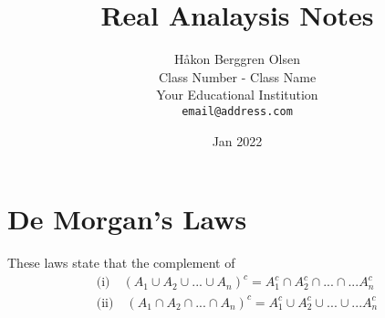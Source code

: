 \documentclass[12pt,fleqn,leqno,letterpaper]{article}
\title{Real Analaysis Notes}
\author{Håkon Berggren Olsen\\
  \small{Class Number - Class Name}\\
  \small{Your Educational Institution}\\
  \small{\texttt{email@address.com}}
}
\date{Jan 2022}
\begin{document}
 
\maketitle



\section*{De Morgan's Laws}
These laws state that the complement of 
\begin{align*}
	\text{(i)} \quad  (A_1 \cup A_2 \cup... \cup A_n)^c = A_1^c \cap A_2^c \cap ... \cap...A_n^c \\
	\text{(ii)} \quad  (A_1 \cap A_2 \cap... \cap A_n)^c = A_1^c \cup A_2^c \cup ... \cup...A_n^c \\
\end{align*}



\end{document}
